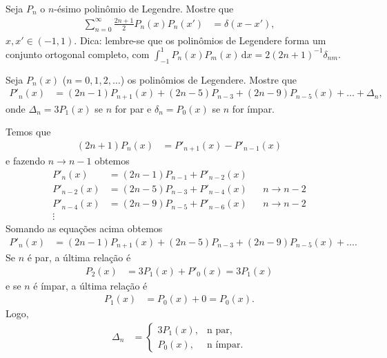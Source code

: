 \documentclass[a4paper,12pt, leqno, answers]{exam}
\begin{document}
\begin{questions}
\begin{solution}
    \end{solution}

    \question[E de 2010] Seja $P_n$ o $n$-\'{e}simo polin\^{o}mio de Legendre. Mostre que
    \begin{align*}
        \sum_{n = 0}^\infty \frac{2n + 1}{2} P_n(x) P_n(x') &= \delta(x - x'),
    \end{align*}
    $x, x' \in (-1, 1)$. Dica: lembre-se que os polin\^{o}mios de Legendere forma um conjunto ortogonal completo, com $\int_{-1}^1 P_n(x) P_m(x) \,\mathrm{d}x = 2 (2 n + 1)^{-1} \delta_{nm}$.
    \begin{solution}
        
    \end{solution}

    \question[T6 de 2011] Seja $P_n(x)$ ($n = 0, 1, 2, \ldots$) os polin\^{o}mios de Legendere. Mostre que
    \begin{align*}
        P'_n(x) &= (2n - 1) P_{n + 1}(x) + (2n - 5) P_{n - 3} + (2n - 9) P_{n - 5}(x) + \ldots + \Delta_n,
    \end{align*}
    onde $\Delta_n = 3 P_1(x)$ se $n$ for par e $\delta_n = P_0(x)$ se $n$ for \'{i}mpar.
    \begin{solution}
        Temos que
        \begin{align*}
            (2n + 1) P_n(x) &= P'_{n + 1}(x) - P'_{n - 1}(x)
        \end{align*}
        e fazendo $n \to n - 1$ obtemos
        \begin{align*}
            P'_n(x) &= (2n - 1) P_{n - 1} + P'_{n - 2}(x) \\
            P'_{n - 2}(x) &= (2n - 5) P_{n - 3} + P'_{n - 4}(x) && n \to n - 2 \\
            P'_{n - 4}(x) &= (2n - 9) P_{n - 5} + P'_{n - 6}(x) && n \to n - 2 \\
            \vdots
        \end{align*}
        Somando as equa\c{c}\~{o}es acima obtemos
        \begin{align*}
            P'_n(x) &= (2n - 1) P_{n + 1}(x) + (2n - 5) P_{n - 3} + (2n - 9) P_{n - 5}(x) + \ldots.
        \end{align*}
        Se $n$ \'{e} par, a \'{u}ltima rela\c{c}\~{a}o \'{e}
        \begin{align*}
            P_2(x) &= 3 P_1(x) + P'_0(x) = 3 P_1(x)
        \end{align*}
        e se $n$ \'{e} \'{i}mpar, a \'{u}ltima rela\c{c}\~{a}o \'{e}
        \begin{align*}
            P_1(x) &= P_0(x) + 0 = P_0(x).
        \end{align*}
        Logo,
        \begin{align*}
            \Delta_n &= \begin{cases}
                3 P_1(x), & \text{n par}, \\
                P_0(x), & \text{n \'{i}mpar}.
            \end{cases}
        \end{align*}
    \end{solution}


\end{questions}
\end{document}
